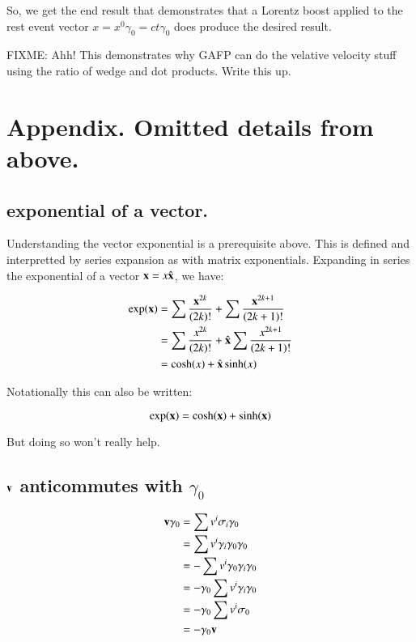 \documentclass{article}      %
\begin{document}
So, we get the end result that demonstrates that a Lorentz boost applied to the rest event vector $x = x^0 \gamma_0 = c t \gamma_0$ does produce the desired result.

FIXME: Ahh!  This demonstrates why GAFP can do the velative velocity stuff using the ratio of wedge and dot products.  Write this up.

\section{ Appendix. Omitted details from above. }

\subsection{ exponential of a vector. } 

Understanding the vector exponential is a prerequisite above.  This is defined
and interpretted by series expansion as with matrix exponentials.
Expanding
in series the exponential of a vector $\mathbf{x} = x\hat{\mathbf{x}}$, we have:

\begin{align*}
\exp(\mathbf{x})
&= \sum \frac{\mathbf{x}^{2k}}{(2k)!} + \sum \frac{\mathbf{x}^{2k+1}}{(2k+1)!} \\
&= \sum \frac{x^{2k}}{(2k)!} + \hat{\mathbf{x}} \sum \frac{x^{2k+1}}{(2k+1)!} \\
&= \cosh(x) + \hat{\mathbf{x}} \sinh(x)
\end{align*}

Notationally this can also be written:

\begin{equation*}
\exp(\mathbf{x}) = \cosh(\mathbf{x}) + \sinh(\mathbf{x})
\end{equation*}

But doing so won't really help.

\subsection{ $\mathbf{v}$ anticommutes with $\gamma_0$ }

\begin{align*}
\mathbf{v} \gamma_0 
&= \sum v^i \sigma_i \gamma_0 \\
&= \sum v^i \gamma_i \gamma_0 \gamma_0 \\
&= -\sum v^i \gamma_0 \gamma_i \gamma_0 \\
&= - \gamma_0 \sum v^i \gamma_i \gamma_0 \\
&= - \gamma_0 \sum v^i \sigma_0 \\
&= - \gamma_0 \mathbf{v}
\end{align*}
\end{document}
